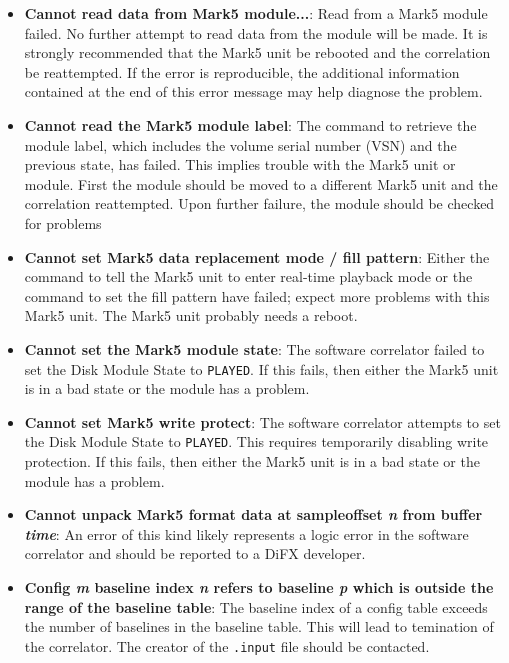 \begin{itemize}
\item {\bf Cannot read data from Mark5 module...}:
Read from a Mark5 module failed.
No further attempt to read data from the module will be made.
It is strongly recommended that the Mark5 unit be rebooted and the correlation be reattempted.
If the error is reproducible, the additional information contained at the end of this error message may help diagnose the problem.

\item {\bf Cannot read the Mark5 module label}:
The command to retrieve the module label, which includes the volume serial number (VSN) and the previous state, has failed.
This implies trouble with the Mark5 unit or module.
First the module should be moved to a different Mark5 unit and the correlation reattempted.
Upon further failure, the module should be checked for problems

\item {\bf Cannot set Mark5 data replacement mode / fill pattern}:
Either the command to tell the Mark5 unit to enter real-time playback mode or the command to set the fill pattern have
failed; expect more problems with this Mark5 unit.
The Mark5 unit probably needs a reboot.

\item {\bf Cannot set the Mark5 module state}:
The software correlator failed to set the Disk Module State to {\tt PLAYED}.
If this fails, then either the Mark5 unit is in a bad state or the module has a problem.

\item {\bf Cannot set Mark5 write protect}:
The software correlator attempts to set the Disk Module State to {\tt PLAYED}.
This requires temporarily disabling write protection.
If this fails, then either the Mark5 unit is in a bad state or the module has a problem.

\item {\bf Cannot unpack Mark5 format data at sampleoffset {\it n} from buffer {\it time}}:
An error of this kind likely represents a logic error in the software correlator and should be reported to a DiFX developer.

\item {\bf Config {\it m} baseline index {\it n} refers to baseline {\it p} which is outside the range of the baseline table}:
The baseline index of a config table exceeds the number of baselines in the baseline table.
This will lead to temination of the correlator.
The creator of the {\tt .input} file should be contacted.


\end{itemize}
